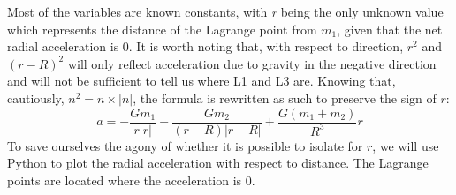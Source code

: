 Most of the variables are known constants, with \textit{r} being the only unknown value which represents the distance of the Lagrange point from $m_1$, given that the net radial acceleration is 0.
It is worth noting that, with respect to direction, $r^2$ and $(r-R)^2$ will only reflect acceleration due to gravity in the negative direction and will not be sufficient to tell us where L1 and L3 are.
Knowing that, cautiously, $n^2 = n \times |n|$, the formula is rewritten as such to preserve the sign of $r$:
\begin{equation*}
	a = -\frac{Gm_1}{r|r|} - \frac{Gm_2}{(r - R)|r - R|} + \frac{G(m_1+m_2)}{R^3}r
\end{equation*}
To save ourselves the agony of whether it is possible to isolate for $r$, we will use Python to plot the radial acceleration with respect to distance. The Lagrange points are located where the acceleration is 0.
